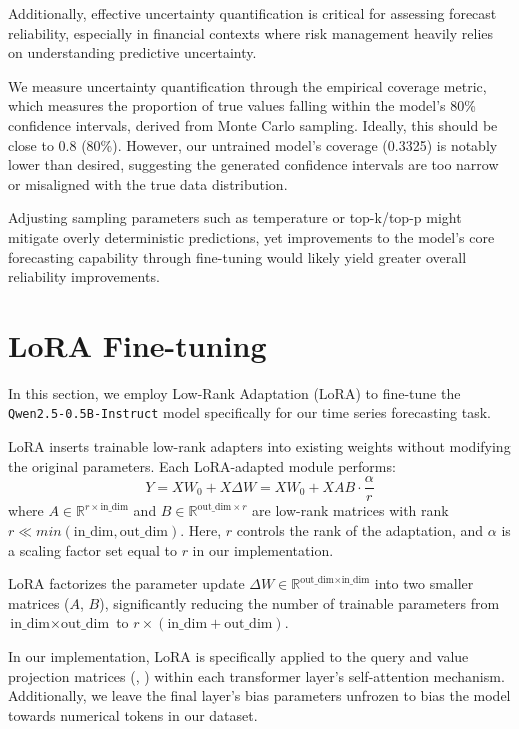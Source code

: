 \documentclass[11pt]{article}
\begin{document}
Additionally, effective uncertainty quantification is critical for assessing forecast reliability, especially in financial contexts where risk management heavily relies on understanding predictive uncertainty. 

We measure uncertainty quantification through the empirical coverage metric, which measures the proportion of true values falling within the model’s 80\% confidence intervals, derived from Monte Carlo sampling. Ideally, this should be close to 0.8 (80\%). However, our untrained model's coverage (0.3325) is notably lower than desired, suggesting the generated confidence intervals are too narrow or misaligned with the true data distribution. 

Adjusting sampling parameters such as temperature or top-k/top-p might mitigate overly deterministic predictions, yet improvements to the model’s core forecasting capability through fine-tuning would likely yield greater overall reliability improvements.

\section{LoRA Fine-tuning}

In this section, we employ Low-Rank Adaptation (LoRA)\cite{hu2021loralowrankadaptationlarge} to fine-tune the \texttt{Qwen2.5-0.5B-Instruct} model specifically for our time series forecasting task.

LoRA inserts trainable low-rank adapters into existing weights without modifying the original parameters. Each LoRA-adapted module performs:
\begin{equation}
Y = XW_0 + X\Delta W = XW_0 + XAB\cdot\frac{\alpha}{r}
\end{equation}
where $A \in \mathbb{R}^{r \times \text{in\_dim}}$ and $B \in \mathbb{R}^{\text{out\_dim} \times r}$ are low-rank matrices with rank $r \ll min(\text{in\_dim}, \text{out\_dim})$. Here, $r$ controls the rank of the adaptation, and $\alpha$ is a scaling factor set equal to $r$ in our implementation.

LoRA factorizes the parameter update $\Delta W \in \mathbb{R}^{\text{out\_dim} \times \text{in\_dim}}$ into two smaller matrices ($A$, $B$), significantly reducing the number of trainable parameters from $\text{in\_dim} \times \text{out\_dim}$ to $r \times (\text{in\_dim} + \text{out\_dim})$.

In our implementation, LoRA is specifically applied to the query and value projection matrices (, ) within each transformer layer's self-attention mechanism. Additionally, we leave the final layer's bias parameters unfrozen to bias the model towards numerical tokens in our dataset.
\end{document}

